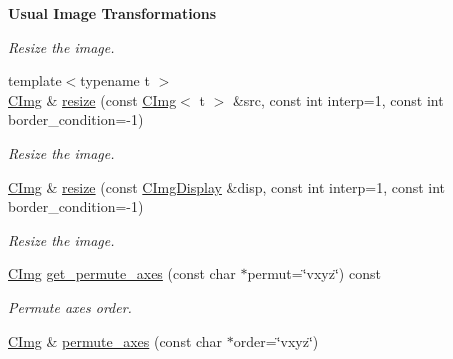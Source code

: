 \begin{Indent}{\bf Usual Image Transformations}
\begin{DoxyCompactItemize}
\begin{DoxyCompactList}\small\item\em Resize the image. \item\end{DoxyCompactList}\item 
{\footnotesize template$<$typename t $>$ }\\\hyperlink{structcimg__library_1_1_c_img}{CImg} \& \hyperlink{structcimg__library_1_1_c_img_a45512054602bebcef182e80ebc2db810}{resize} (const \hyperlink{structcimg__library_1_1_c_img}{CImg}$<$ t $>$ \&src, const int interp=1, const int border\_\-condition=-\/1)
\begin{DoxyCompactList}\small\item\em Resize the image. \item\end{DoxyCompactList}\item 
\hyperlink{structcimg__library_1_1_c_img}{CImg} \& \hyperlink{structcimg__library_1_1_c_img_a97fc47cd0f75974d283a1440992cee1d}{resize} (const \hyperlink{structcimg__library_1_1_c_img_display}{CImgDisplay} \&disp, const int interp=1, const int border\_\-condition=-\/1)
\begin{DoxyCompactList}\small\item\em Resize the image. \item\end{DoxyCompactList}\item 
\hyperlink{structcimg__library_1_1_c_img}{CImg} \hyperlink{structcimg__library_1_1_c_img_a3fe495de66327a6c9ae822dc0fb05508}{get\_\-permute\_\-axes} (const char $\ast$permut=\char`\"{}vxyz\char`\"{}) const 
\begin{DoxyCompactList}\small\item\em Permute axes order. \item\end{DoxyCompactList}\item 
\hypertarget{structcimg__library_1_1_c_img_aec4879624da69845ca1907fc4464e006}{
\hyperlink{structcimg__library_1_1_c_img}{CImg} \& \hyperlink{structcimg__library_1_1_c_img_aec4879624da69845ca1907fc4464e006}{permute\_\-axes} (const char $\ast$order=\char`\"{}vxyz\char`\"{})}
\label{structcimg__library_1_1_c_img_aec4879624da69845ca1907fc4464e006}


\end{DoxyCompactItemize}
\end{Indent}
